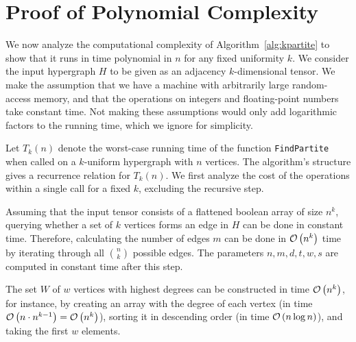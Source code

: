 \section{Proof of Polynomial Complexity}\label{sec:complexity}

We now analyze the computational complexity of Algorithm~\ref{alg:kpartite} to show that it runs in time polynomial in $n$ for any fixed uniformity $k$.
We consider the input hypergraph $H$ to be given as an adjacency $k$-dimensional tensor.
We make the assumption that we have a machine with arbitrarily large random-access memory,
and that the operations on integers and floating-point numbers take constant time.
Not making these assumptions would only add logarithmic factors to the running time, which we ignore for simplicity.

Let $T_k(n)$ denote the worst-case running time of the function \texttt{FindPartite} when called on a $k$-uniform hypergraph with $n$ vertices.
The algorithm's structure gives a recurrence relation for $T_k(n)$.
We first analyze the cost of the operations within a single call for a fixed $k$, excluding the recursive step.

Assuming that the input tensor consists of a flattened boolean array of size $n^k$,
querying whether a set of $k$ vertices forms an edge in $H$ can be done in constant time.
Therefore, calculating the number of edges $m$ can be done in $\mathcal{O}\left(n^k\right)$ time by iterating through all $\binom{n}{k}$ possible edges.
The parameters $n, m, d, t, w, s$ are computed in constant time after this step.

The set $W$ of $w$ vertices with highest degrees can be constructed in time $\mathcal{O}\left(n^k\right)$, for instance, by
creating an array with the degree of each vertex (in time  $\mathcal{O}\left(n \cdot n^{k-1}\right) = \mathcal{O}\left(n^k\right)$),
sorting it in descending order (in time $\mathcal{O}\left(n \log n\right)$),
and taking the first $w$ elements.

